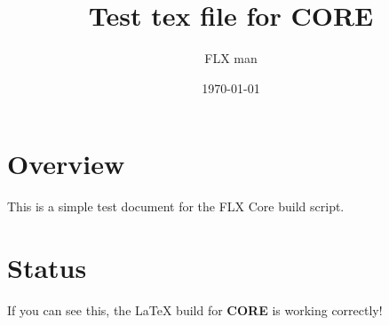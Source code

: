 \documentclass{article}
\begin{document}
\title{Test tex file for CORE}
\author{FLX man}
\date{\today}
\maketitle

\section{Overview}
This is a simple test document for the FLX Core build script.

\section{Status}
If you can see this, the LaTeX build for \textbf{CORE} is working correctly!
\end{document}
